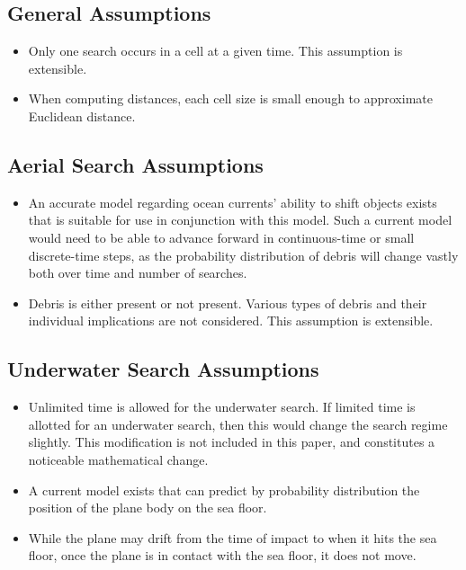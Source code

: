 \documentclass[a4paper]{article}
\begin{document}
\subsection{General Assumptions}

\begin{itemize}
\item Only one search occurs in a cell at a given time. This assumption is extensible.
\item When computing distances, each cell size is small enough to approximate Euclidean distance.
\end{itemize}

\subsection{Aerial Search Assumptions}

\begin{itemize}
\item An accurate model regarding ocean currents' ability to shift objects exists that is suitable for use in conjunction with this model. Such a current model would need to be able to advance forward in continuous-time or small discrete-time steps, as the probability distribution of debris will change vastly both over time and number of searches.
\item Debris is either present or not present. Various types of debris and their individual implications are not considered. This assumption is extensible.
\end{itemize}
\subsection{Underwater Search Assumptions}

\begin{itemize}
\item Unlimited time is allowed for the underwater search. If limited time is allotted for an underwater search, then this would change the search regime slightly. This modification is not included in this paper, and constitutes a noticeable mathematical change.
\item A current model exists that can predict by probability distribution the position of the plane body on the sea floor.
\item While the plane may drift from the time of impact to when it hits the sea floor, once the plane is in contact with the sea floor, it does not move. 
\end{itemize}
\end{document}
